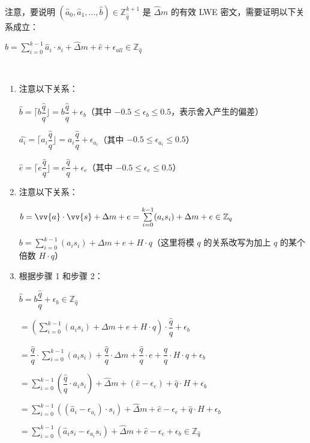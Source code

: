 $ $

注意，要说明 $(\hat{a}_0, \hat{a}_1, \ldots, \hat{b}) \in \mathbb{Z}_{\hat{q}}^{k + 1}$ 是 $\hat{\Delta}m$ 的有效 LWE 密文，需要证明以下关系成立：

$\hat{b} = \sum\limits_{i=0}^{k-1}\hat{a}_i \cdot s_i + \hat{\Delta} m + \hat{e}+\epsilon_{\textit{all}} \in \mathbb{Z}_{\hat{q}}$

$ $

\begin{myproof}
\begin{enumerate}
\item 注意以下关系：

$\hat{b} = \Big\lceil b \dfrac{\hat{q}}{q} \Big\rfloor = b\dfrac{\hat{q}}{q} + \epsilon_b$（其中 $-0.5 \le \epsilon_b \le 0.5$，表示舍入产生的偏差）

$\hat{a_i} = \Big\lceil a_i \dfrac{\hat{q}}{q} \Big\rfloor = a_i\dfrac{\hat{q}}{q} + \epsilon_{a_i}$（其中 $-0.5 \le \epsilon_{a_i} \le 0.5$）

$\hat{e} = \Big\lceil e \dfrac{\hat{q}}{q} \Big\rfloor = e\dfrac{\hat{q}}{q} + \epsilon_e$（其中 $-0.5 \le \epsilon_e \le 0.5$）
\item 注意以下关系：

$b = \vv{a} \cdot \vv{s} + \Delta  m + e = \sum\limits_{i=0}^{k-1}(a_is_i) + \Delta m + e  \in \mathbb{Z}_q$

$b = \sum\limits_{i=0}^{k-1}(a_is_i) + \Delta m + e + H \cdot q$（这里将模 $q$ 的关系改写为加上 $q$ 的某个倍数 $H \cdot q$）

\item 根据步骤 1 和步骤 2：

$\hat{b} = b\dfrac{\hat{q}}{q} + \epsilon_b \in \mathbb{Z}_{\hat{q}}$

$= \left(\sum\limits_{i=0}^{k-1}(a_is_i) + \Delta m + e + H \cdot q\right) \cdot \dfrac{\hat{q}}{q}  + \epsilon_b$

$= \dfrac{\hat{q}}{q} \cdot \sum\limits_{i=0}^{k-1}(a_is_i) + \dfrac{\hat{q}}{q} \cdot \Delta m + \dfrac{\hat{q}}{q} \cdot e + \dfrac{\hat{q}}{q} \cdot H \cdot q + \epsilon_b$

$= \sum\limits_{i=0}^{k-1}\left(\dfrac{\hat{q}}{q} \cdot a_is_i\right) + \hat{\Delta} m + (\hat{e} - \epsilon_e) + \hat{q}\cdot H + \epsilon_b$

$= \sum\limits_{i=0}^{k-1}\left((\hat{a}_i - \epsilon_{a_i}) \cdot s_i\right) + \hat{\Delta} m + \hat{e} - \epsilon_e + \hat{q}\cdot H + \epsilon_b$

$= \sum\limits_{i=0}^{k-1}(\hat{a}_is_i - \epsilon_{a_i}s_i) + \hat{\Delta} m + \hat{e} - \epsilon_e + \epsilon_b \in \mathbb{Z}_{\hat{q}}$


\end{enumerate}
\end{myproof}

